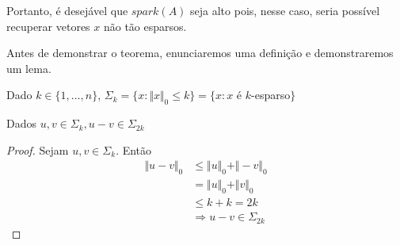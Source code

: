 Portanto, é desejável que $\textit{spark}(A)$ seja alto pois, nesse caso, seria possível recuperar vetores $x$ não tão esparsos.

Antes de demonstrar o teorema, enunciaremos uma definição e demonstraremos um lema.

\begin{definicao}
Dado $k \in \lbrace 1, \hdots , n \rbrace$,
$ \Sigma_k = \lbrace x : \Vert x \Vert_{0} \leq k \rbrace
           = \lbrace x : x $ é $k$-esparso$ \rbrace$
\end{definicao}

\begin{lema}
Dados $u, v \in \Sigma_k, u - v \in \Sigma_{2k}$
\end{lema}
\begin{proof}
Sejam $u, v \in \Sigma_k$. Então
\begin{subequations}
\begin{align*}
\Vert u - v \Vert_0 & \leq \Vert u \Vert_0 + \Vert -v \Vert_0 \\
& = \Vert u \Vert_0 + \Vert v \Vert_0 \\
& \leq k + k = 2k \\
& \Rightarrow u - v \in \Sigma_{2k}
\end{align*}
\end{subequations}
\end{proof}

